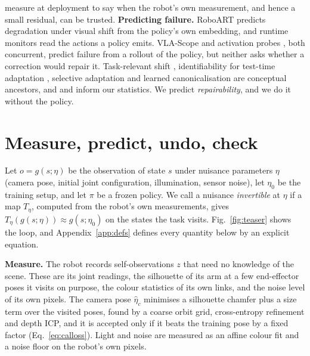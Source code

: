 \documentclass{article}
\begin{document}
measure at deployment to say when the robot's own measurement, and hence a small residual, can be trusted.
\textbf{Predicting failure.} RoboART \citep{roboart} predicts degradation under visual shift from the policy's own
embedding, and runtime monitors \citep{sentinel,faildetect,safevla,fiper,actprobe,triinfo} read the actions a policy
emits. VLA-Scope \citep{vlascope} and activation probes \citep{earlywarning}, both concurrent, predict failure from a
rollout of the policy, but neither asks whether a correction would repair it. Task-relevant shift \citep{farid},
identifiability for test-time adaptation \citep{ttaident}, selective adaptation \citep{selectivetta} and learned
canonicalisation \citep{kaba} are conceptual ancestors, and \citet{butterfly} and \citet{vincent} inform our
statistics. We predict \emph{repairability}, and we do it without the policy.

\section{Measure, predict, undo, check}
\label{sec:method}
Let $o = g(s;\eta)$ be the observation of state $s$ under nuisance parameters $\eta$ (camera pose, initial joint
configuration, illumination, sensor noise), let $\eta_0$ be the training setup, and let $\pi$ be a frozen policy. We
call a nuisance \emph{invertible} at $\eta$ if a map $T_\eta$, computed from the robot's own measurements, gives
$T_\eta(g(s;\eta)) \approx g(s;\eta_0)$ on the states the task visits. Fig.~\ref{fig:teaser} shows the loop, and
Appendix~\ref{app:defs} defines every quantity below by an explicit equation.

\textbf{Measure.} The robot records self-observations $z$ that need no knowledge of the scene. These are its joint
readings, the silhouette of its arm at a few end-effector poses it visits on purpose, the colour statistics of its own
links, and the noise level of its own pixels. The camera pose $\hat\eta_c$ minimises a silhouette chamfer plus a size
term over the visited poses, found by a coarse orbit grid, cross-entropy refinement and depth ICP, and it is accepted
only if it beats the training pose by a fixed factor (Eq.~\ref{eq:calloss}). Light and noise are measured as an affine
colour fit and a noise floor on the robot's own pixels.
\end{document}
